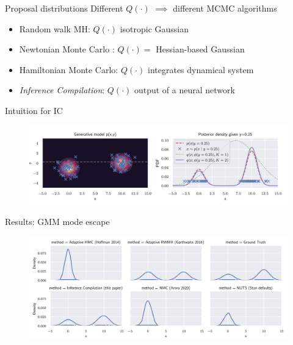 \begin{frame}[fragile]{Proposal distributions}
    Different $Q(\cdot)$ $\implies$ different MCMC algorithms
    
    \begin{itemize}
        \item Random walk MH: $Q(\cdot)$ isotropic Gaussian
        \item Newtonian Monte Carlo \parencite{arora2020newtonian}:
        $Q(\cdot) =$ Hessian-based Gaussian
        \item Hamiltonian Monte Carlo: $Q(\cdot)$ integrates dynamical system
        \item \emph{Inference Compilation}: $Q(\cdot)$ output of a neural network
    \end{itemize}
\end{frame}

\begin{frame}{Intuition for IC}
    \begin{figure}
        \centering
        \includegraphics[width=\textwidth]{Figures/lic/intuition.png}
    \end{figure}
\end{frame}

\begin{frame}{Results: GMM mode escape}
    \begin{figure}
        \centering
        \includegraphics[width=\textwidth]{Figures/lic/gmm-escape.png}
    \end{figure}
\end{frame}

